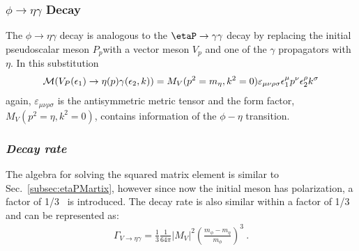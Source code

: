 \subsubsection{$\phi \to \eta \gamma$ Decay}\label{sec:phi.etag}
The $\phi \rightarrow \eta \gamma $ decay is analogous to the $\etaP \rightarrow \gamma \gamma$ decay by replacing the initial pseudoscalar meson $P_p$with a vector meson $V_p$ and one of the $\gamma$ propagators with $\eta$. In this substitution 
\begin{align}\label{eq:phi.etag.amp}
{\cal M}(V_P(\epsilon_1) \to \eta(p) \gamma(\epsilon_2,k)) = {M}_V(p^2=m_{\eta},k^2=0) \varepsilon_{\mu\nu\rho\sigma}\epsilon_1^\mu p^\nu \epsilon_2^\rho k^\sigma
\end{align}
again, $\varepsilon_{\mu\nu\rho\sigma}$ is the antisymmetric metric tensor and the form factor, ${M}_V(p^2=\eta,k^2=0)$, contains information of the $\phi-\eta$ transition.

\subsubsection{\emph{Decay rate}}
The algebra for solving the squared matrix element is similar to Sec.~\ref{subsec:etaPMartix}, however since now the initial meson has polarization, a factor of 1/3~\cite{Hanhart2015} is introduced. The decay rate is also similar within a factor of 1/3 and can be represented as:
\begin{align}\label{eq:phi.etag.decay.final}
\Gamma_{V\rightarrow\eta\gamma} = \frac{1}{3} \frac{1}{64\pi} \left|M_{V}\right|^{2}\left(\frac{m_{\phi} - m_{\eta}}{m_{\phi}} \right)^{3} \ .
\end{align}


